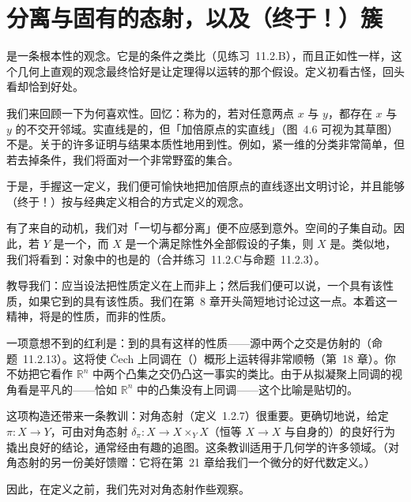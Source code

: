 
\chapter{分离与固有的态射，以及（终于！）簇}
\label{ch:separated-proper}

\trSeparatedness{}是一条根本性的观念。它是\trManifold{}的\trHausdorff{}条件之类比（见\mbox{练习~11.2.B}），而且正如\trHausdorff{}性一样，这个几何上直观的观念最终恰好是让定理得以运转的那个假设。定义初看古怪，回头看却恰到好处。

我们来回顾一下为何喜欢\trHausdorff{}性。回忆：\trTopologicalSpace{}称为\trHausdorff{}的，若对任意两点 $x$ 与 $y$，都存在 $x$ 与 $y$ 的不交开邻域。实直线是\trHausdorff{}的，但「加倍原点的实直线」（图~4.6 可视为其草图）不是。关于\trManifold{}的许多证明与结果本质性地用到\trHausdorff{}性。例如，紧一维\trManifold{}的分类非常简单，但若去掉\trHausdorff{}条件，我们将面对一个非常野蛮的集合。

于是，手握这一定义，我们便可愉快地把加倍原点的直线逐出文明讨论，并且能够（终于！）按与经典定义相合的方式定义\trVariety{}的观念。

有了来自\trManifold{}的动机，我们对「一切\trAffineScheme{}与\trProjectiveScheme{}都分离」便不应感到意外。\trHausdorff{}空间的子集自动\trHausdorff。因此，若 $Y$ 是一个\trManifold，而 $X$ 是一个满足\trManifold{}除\trHausdorff{}性外全部假设的子集，则 $X$ 是\trManifold。类似地，我们将看到：\trSeparated{}对象中的\trLocally\trClosedEmbedding{}也是\trSeparated{}的（合并\mbox{练习~11.2.C}与命题~11.2.3）。

\trGrothendieck{}教导我们：应当设法把性质定义在\trMorphism{}上而非\trObject{}上；然后我们便可以说，一个\trObject{}具有该性质，如果它到\trFinalObject{}的\trMorphism{}具有该性质。我们在第~8 章开头简短地讨论过这一点。本着这一精神，\trSeparatedness{}将是\trMorphism{}的性质，而非\trScheme{}的性质。

一项意想不到的红利是：到\trAffineScheme{}的\trSeparated{}\trMorphism{}具有这样的性质——源中两个\trAffine\trOpenSet{}之交是仿射的（命题~11.2.13）。这将使 \v{C}ech 上同调在（\trQuasicompact{}）概形上运转得非常顺畅（第~18 章）。你不妨把它看作 $\mathbb{R}^n$ 中两个凸集之交仍凸这一事实的类比。由于\trAffineScheme{}从拟凝聚上同调的视角看是平凡的——恰如 $\mathbb{R}^n$ 中的凸集没有上同调——这个比喻是贴切的。

这项构造还带来一条教训：对角态射（定义~1.2.7）很重要。更确切地说，给定\trMorphism{} $\pi\colon X\to Y$，可由对角态射 $\delta_\pi\colon X\to X\times_Y X$（恒等\trMorphism{} $X\to X$ 与自身的\trFiberProduct{}）的良好行为撬出良好的结论，通常经由有趣的追图。这条教训适用于几何学的许多领域。（对角态射的另一份美好馈赠：它将在第~21 章给我们一个微分的好代数定义。）

因此，在定义\trSeparatedness{}之前，我们先对对角态射作些观察。






